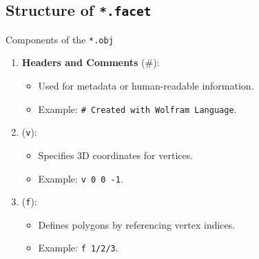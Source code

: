 \subsection{Structure of \texttt{*.facet}}
\begin{frame}{Components of the \texttt{*.obj}}
    \begin{enumerate}
        \item \textbf{Headers and Comments} (\#):
            \begin{itemize}
                \item Used for metadata or human-readable information.
                \item Example: \texttt{\# Created with Wolfram Language}.
            \end{itemize}

        \item {} (\texttt{v}):
            \begin{itemize}
                \item Specifies 3D coordinates for vertices.
                \item Example: \texttt{v 0 0 -1}.
            \end{itemize}

        \item {} (\texttt{f}):
            \begin{itemize}
                \item Defines polygons by referencing vertex indices.
                \item Example: \texttt{f 1/2/3}.
            \end{itemize}
    \end{enumerate}
        \setcounter{listnumber}{\value{enumi}}
\end{frame}

\endinput  %
